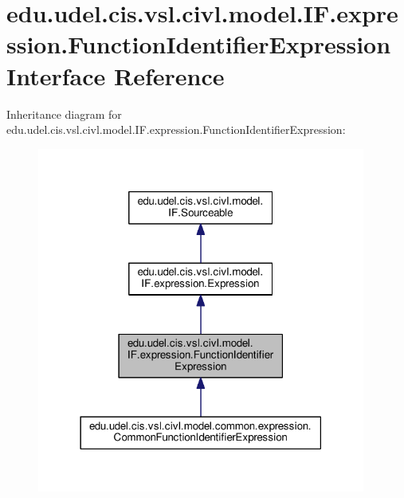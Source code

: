 \hypertarget{interfaceedu_1_1udel_1_1cis_1_1vsl_1_1civl_1_1model_1_1IF_1_1expression_1_1FunctionIdentifierExpression}{}\section{edu.\+udel.\+cis.\+vsl.\+civl.\+model.\+I\+F.\+expression.\+Function\+Identifier\+Expression Interface Reference}
\label{interfaceedu_1_1udel_1_1cis_1_1vsl_1_1civl_1_1model_1_1IF_1_1expression_1_1FunctionIdentifierExpression}


Inheritance diagram for edu.\+udel.\+cis.\+vsl.\+civl.\+model.\+I\+F.\+expression.\+Function\+Identifier\+Expression\+:
\nopagebreak
\begin{figure}[H]
\begin{center}
\leavevmode
\includegraphics[width=306pt]{interfaceedu_1_1udel_1_1cis_1_1vsl_1_1civl_1_1model_1_1IF_1_1expression_1_1FunctionIdentifierExpression__inherit__graph}
\end{center}
\end{figure}



